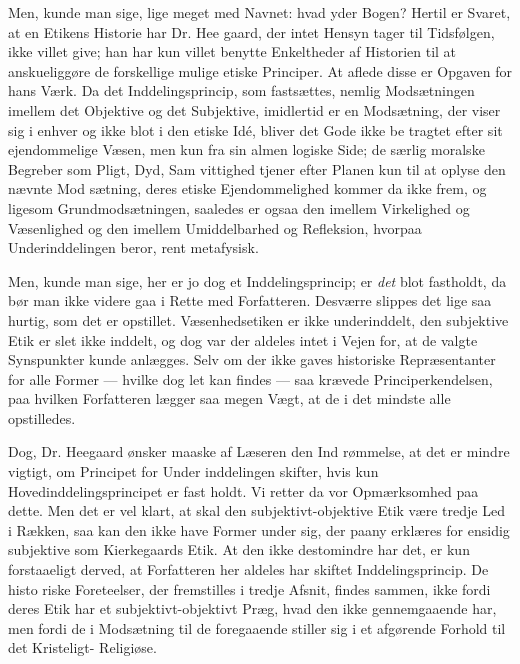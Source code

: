 \documentclass[12pt,a4paper,openany]{book}
\newcommand{\opage}[1]{\marginnote{\footnotesize\textit{[#1]}}}
\begin{document}
Men, kunde man sige, lige meget med Navnet: hvad yder
Bogen? Hertil er Svaret, at en Etikens Historie har Dr. Hee\-%
gaard, der intet Hensyn tager til Tidsfølgen, ikke villet give;
han har kun villet benytte Enkeltheder af Historien til at
anskueliggøre de forskellige mulige etiske Principer. At aflede
disse er Opgaven for hans Værk. Da det Inddelingsprincip,
som fastsættes, nemlig Modsætningen imellem det Objektive og
det Subjektive, imidlertid er en Modsætning, der viser sig i
enhver og ikke blot i den etiske Idé, bliver det Gode ikke be\-%
tragtet efter sit ejendommelige Væsen, men kun fra sin almen\-%
logiske Side; de særlig moralske Begreber som Pligt, Dyd, Sam\-%
vittighed tjener efter Planen kun til at oplyse den nævnte Mod\-%
sætning, deres etiske Ejendommelighed kommer da ikke frem, og
\opage{29}ligesom Grundmodsætningen, saaledes er ogsaa den imellem
Virkelighed og Væsenlighed og den imellem Umiddelbarhed og
Refleksion, hvorpaa Underinddelingen beror, rent metafysisk.

Men, kunde man sige, her er jo dog et Inddelingsprincip;
er \emph{det} blot fastholdt, da bør man ikke videre gaa i Rette med
Forfatteren. Desværre slippes det lige saa hurtig, som det er
opstillet. Væsenhedsetiken er ikke underinddelt, den subjektive
Etik er slet ikke inddelt, og dog var der aldeles intet i Vejen
for, at de valgte Synspunkter kunde anlægges. Selv om der
ikke gaves historiske Repræsentanter for alle Former --- hvilke
dog let kan findes --- saa krævede Principerkendelsen, paa
hvilken Forfatteren lægger saa megen Vægt, at de i det mindste
alle opstilledes.

Dog, Dr. Heegaard ønsker maaske af Læseren den Ind\-%
rømmelse, at det er mindre vigtigt, om Principet for Under\-%
inddelingen skifter, hvis kun Hovedinddelingsprincipet er fast\-%
holdt. Vi retter da vor Opmærksomhed paa dette. Men det er
vel klart, at skal den subjektivt-objektive Etik være tredje
Led i Rækken, saa kan den ikke have Former under sig, der
paany erklæres for ensidig subjektive som Kierkegaards Etik.
At den ikke destomindre har det, er kun forstaaeligt derved, at
Forfatteren her aldeles har skiftet Inddelingsprincip. De histo\-%
riske Foreteelser, der fremstilles i tredje Afsnit, findes sammen,
ikke fordi deres Etik har et subjektivt-objektivt Præg, hvad den
ikke gennemgaaende har, men fordi de i Modsætning til de
foregaaende stiller sig i et afgørende Forhold til det Kristeligt-%
Religiøse.
\end{document}
